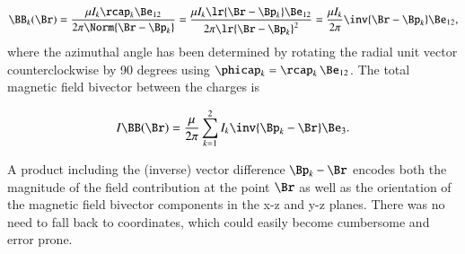 \begin{dmath}\label{eqn:amperesLawMagnetostaticsExample:80}
\BB_k(\Br)
= \frac{\mu I_k \rcap_k \Be_{12} }{2 \pi \Norm{ \Br - \Bp_k} }
= \frac{\mu I_k \lr{ \Br - \Bp_k} \Be_{12} }{2 \pi \lr{ \Br - \Bp_k}^2 }
= \frac{\mu I_k}{2\pi} \inv{ \Br - \Bp_k} \Be_{12},
\end{dmath}
where the azimuthal angle has been determined by rotating the radial unit vector counterclockwise by 90 degrees using \( \phicap_k = \rcap_k\, \Be_{12} \).
The total magnetic field bivector between the charges is

\begin{equation}\label{eqn:amperesLawMagnetostaticsExample:100}
I \BB(\Br)
= \frac{\mu}{2\pi} \sum_{k = 1}^2 I_k \inv{\Bp_k - \Br } \Be_3.
\end{equation}

A product including the (inverse) vector difference \( \Bp_k - \Br \) encodes both the magnitude of the field contribution at the point \( \Br \) as well as the orientation of the magnetic field bivector components in the x-z and y-z planes.
There was no need to fall back to coordinates, which could easily become cumbersome and error prone.
